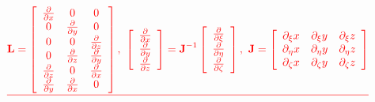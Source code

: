\documentclass[materials,article,submit,moreauthors,pdftex]{Definitions/mdpi}
\providecommand{\DIFdel}[1]{{\protect\color{red}\sout{#1}}}                      %
\providecommand{\DIFdelend}{} %
\begin{document}
\begin{eqnarray*}
\DIFdel{\textbf{L}=\left [
\begin{array}{ccc}
\frac{\partial }{\partial x} & 0 & 0\\
0 & \frac{\partial }{\partial y} & 0\\
0 & 0 & \frac{\partial }{\partial z}\\
0 & \frac{\partial }{\partial z} & \frac{\partial }{\partial y}\\
\frac{\partial }{\partial z} & 0 & \frac{\partial }{\partial x}\\
\frac{\partial }{\partial y} & \frac{\partial }{\partial x} & 0
\end{array} \right],\ 
\left [
\begin{array}{c}
\frac{\partial }{\partial x}\\
\frac{\partial }{\partial y}\\
\frac{\partial }{\partial z}
\end{array} \right] =\textbf{J}^{-1}
\left [
\begin{array}{c}
\frac{\partial }{\partial \xi}\\
\frac{\partial }{\partial \eta}\\
\frac{\partial }{\partial \zeta}
\end{array} \right], \ 
\textbf{J}=\left [
\begin{array}{ccc}
\partial_\xi x & {\partial_\xi y} & {\partial_\xi z}\\
\partial_\eta x & {\partial_\eta y} & {\partial_\eta z}\\
\partial_\zeta x & {\partial_\zeta y} & {\partial_\zeta z}
\end{array} \right]
}\end{eqnarray*}%
\DIFdelend 
\end{document}

